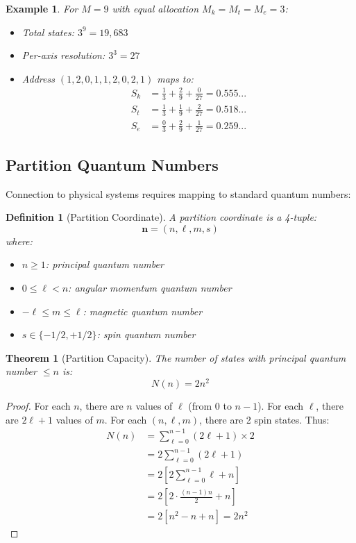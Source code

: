 \documentclass[twocolumn,10pt]{article}
\newtheorem{theorem}{Theorem}
\newtheorem{definition}{Definition}
\newtheorem{example}{Example}
\begin{document}
\begin{example}
For $M = 9$ with equal allocation $M_k = M_t = M_e = 3$:
\begin{itemize}
\item Total states: $3^9 = 19{,}683$
\item Per-axis resolution: $3^3 = 27$
\item Address $(1,2,0,1,1,2,0,2,1)$ maps to:
\begin{align}
S_k &= \frac{1}{3} + \frac{2}{9} + \frac{0}{27} = 0.555... \\
S_t &= \frac{1}{3} + \frac{1}{9} + \frac{2}{27} = 0.518... \\
S_e &= \frac{0}{3} + \frac{2}{9} + \frac{1}{27} = 0.259...
\end{align}
\end{itemize}
\end{example}

\subsection{Partition Quantum Numbers}

Connection to physical systems requires mapping to standard quantum numbers:

\begin{definition}[Partition Coordinate]
A partition coordinate is a 4-tuple:
\begin{equation}
\mathbf{n} = (n, \ell, m, s)
\end{equation}
where:
\begin{itemize}
\item $n \geq 1$: principal quantum number
\item $0 \leq \ell < n$: angular momentum quantum number
\item $-\ell \leq m \leq \ell$: magnetic quantum number
\item $s \in \{-1/2, +1/2\}$: spin quantum number
\end{itemize}
\end{definition}

\begin{theorem}[Partition Capacity]
The number of states with principal quantum number $\leq n$ is:
\begin{equation}
N(n) = 2n^2
\end{equation}
\end{theorem}

\begin{proof}
For each $n$, there are $n$ values of $\ell$ (from $0$ to $n-1$). For each $\ell$, there are $2\ell + 1$ values of $m$. For each $(n,\ell,m)$, there are 2 spin states. Thus:
\begin{align}
N(n) &= \sum_{\ell=0}^{n-1} (2\ell + 1) \times 2 \\
     &= 2\sum_{\ell=0}^{n-1}(2\ell + 1) \\
     &= 2[2\sum_{\ell=0}^{n-1}\ell + n] \\
     &= 2[2 \cdot \frac{(n-1)n}{2} + n] \\
     &= 2[n^2 - n + n] = 2n^2
\end{align}
\end{proof}
\end{document}
